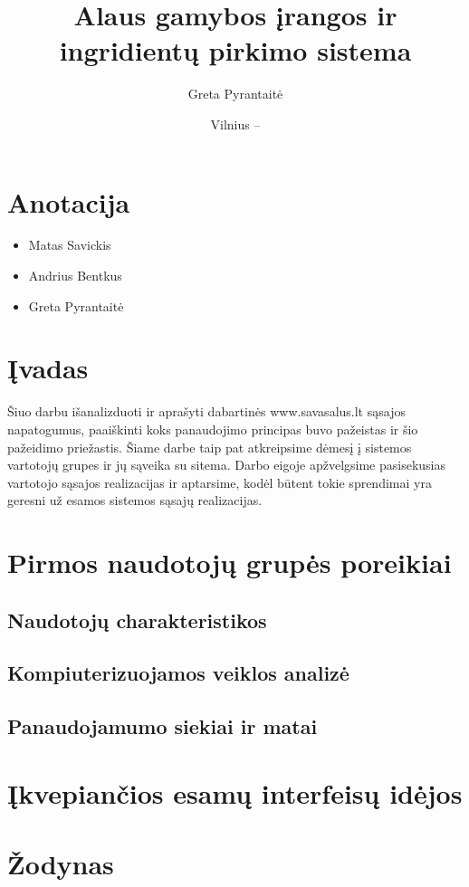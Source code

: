 \documentclass[oneside]{VUMIFPSkursinis}
\title{Alaus gamybos įrangos ir ingridientų pirkimo sistema}
\author{Greta Pyrantaitė}
\date{Vilnius – \the\year}
\begin{document}
\maketitle

\section{Anotacija}
\begin{itemize}
	\item{Matas Savickis}
	\item{Andrius Bentkus}
	\item{Greta Pyrantaitė}

\end{itemize}

\tableofcontents

\section{Įvadas}
Šiuo darbu išanalizduoti ir aprašyti dabartinės www.savasalus.lt sąsajos napatogumus, paaiškinti koks panaudojimo principas buvo pažeistas ir šio pažeidimo priežastis. Šiame darbe taip pat atkreipsime dėmesį į sistemos vartotojų grupes ir jų sąveika su sitema. Darbo eigoje apžvelgsime pasisekusias vartotojo sąsajos realizacijas ir aptarsime, kodėl būtent tokie sprendimai yra geresni už esamos sistemos sąsajų realizacijas. 

\section{Pirmos naudotojų grupės poreikiai}
	\subsection{Naudotojų charakteristikos}
	\subsection{Kompiuterizuojamos veiklos analizė}
	\subsection{Panaudojamumo siekiai ir matai}

\section{Įkvepiančios esamų interfeisų idėjos}

\section{Žodynas}
\end{document}
